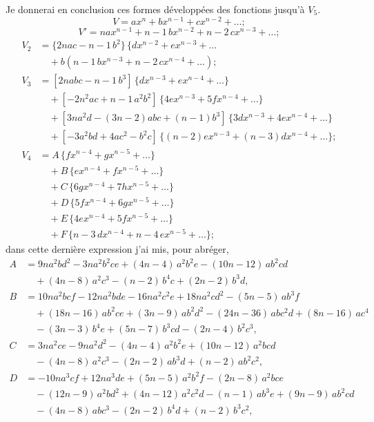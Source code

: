 \documentclass[11pt]{article}
\begin{document}
\medskip
Je donnerai en conclusion ces formes d\'evelopp\'ees des fonctions jusqu'\`a $V_{5}$.
\[
V = ax^{n} + bx^{n - 1} + cx^{n - 2} + \ldots;
\]
\[
V' = nax^{n - 1} + n - 1\,bx^{n - 2} + n - 2\,cx^{n - 3} + \ldots;
\]
\begin{align*}
V_{2} &= \{2nac - n - 1\,b^{2}\}\,\{dx^{n - 2} + ex^{n - 3} + \ldots\\
       &\quad + b(n - 1\,bx^{n - 3} + n - 2\,cx^{n - 4} + \ldots);\\
V_{3} &= [2nabc - n - 1\,b^{3}]\,\{dx^{n - 3} + ex^{n - 4} + \ldots\}\\
       &\quad + [-2n^{2}ac + n - 1\,a^{2}b^{2}]\,\{4ex^{n - 3} + 5fx^{n - 4} + \ldots\}\\
       &\quad + [3na^{2}d - (3n - 2)abc + (n - 1)b^{3}]\,\{3dx^{n - 3} + 4ex^{n - 4} + \ldots\}\\
       &\quad + [-3a^{2}bd + 4ac^{2} - b^{2}c]\,\{(n - 2)ex^{n - 3} + (n - 3)dx^{n - 4} + \ldots\};\\
V_{4} &= A\,\{fx^{n - 4} + gx^{n - 5} + \ldots\}\\
       &\quad + B\,\{ex^{n - 4} + fx^{n - 5} + \ldots\}\\
       &\quad + C\,\{6gx^{n - 4} + 7hx^{n - 5} + \ldots\}\\
       &\quad + D\,\{5fx^{n - 4} + 6gx^{n - 5} + \ldots\}\\
       &\quad + E\,\{4ex^{n - 4} + 5fx^{n - 5} + \ldots\}\\
       &\quad + F\,\{n - 3\,dx^{n - 4} + n - 4\,ex^{n - 5} + \ldots\};
\end{align*}
dans cette derni\`ere expression j'ai mis, pour abr\'eger,
\begin{align*}
A &= 9na^{2}bd^{2} - 3na^{2}b^{2}ce + (4n - 4)\,a^{2}b^{2}e - (10n - 12)\,ab^{2}cd\\
  &\quad + (4n - 8)\,a^{2}c^{3} - (n - 2)\,b^{4}c + (2n - 2)\,b^{3}d,\\
B &= 10na^{2}bcf - 12na^{2}bde - 16na^{2}c^{2}e + 18na^{2}cd^{2} - (5n - 5)\,ab^{3}f\\
  &\quad + (18n - 16)\,ab^{2}ce + (3n - 9)\,ab^{2}d^{2} - (24n - 36)\,abc^{2}d + (8n - 16)\,ac^{4}\\
  &\quad - (3n - 3)\,b^{4}e + (5n - 7)\,b^{3}cd - (2n - 4)\,b^{2}c^{3},\\
C &= 3na^{2}ce - 9na^{2}d^{2} - (4n - 4)\,a^{2}b^{2}e + (10n - 12)\,a^{2}bcd\\
  &\quad - (4n - 8)\,a^{2}c^{3} - (2n - 2)\,ab^{3}d + (n - 2)\,ab^{2}c^{2},\\
D &= -10na^{3}cf + 12na^{3}de + (5n - 5)\,a^{2}b^{2}f - (2n - 8)\,a^{2}bce\\
  &\quad - (12n - 9)\,a^{2}bd^{2} + (4n - 12)\,a^{2}c^{2}d - (n - 1)\,ab^{3}e + (9n - 9)\,ab^{2}cd\\
  &\quad - (4n - 8)\,abc^{3} - (2n - 2)\,b^{4}d + (n - 2)\,b^{3}c^{2},
\end{align*}
\end{document}
